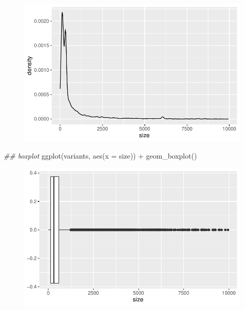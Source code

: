 \documentclass[
  letterpaper,
  DIV=11,
  numbers=noendperiod]{scrreprt}
\newenvironment{Shaded}{\begin{snugshade}}{\end{snugshade}}
\newcommand{\AttributeTok}[1]{\textcolor[rgb]{0.40,0.45,0.13}{#1}}
\newcommand{\DocumentationTok}[1]{\textcolor[rgb]{0.37,0.37,0.37}{\textit{#1}}}
\newcommand{\FunctionTok}[1]{\textcolor[rgb]{0.28,0.35,0.67}{#1}}
\newcommand{\NormalTok}[1]{\textcolor[rgb]{0.00,0.23,0.31}{#1}}
\newcommand{\SpecialCharTok}[1]{\textcolor[rgb]{0.37,0.37,0.37}{#1}}
\begin{document}
\begin{figure}[H]

{\centering \includegraphics{scripts/02_dataViz/class3_files/figure-pdf/unnamed-chunk-14-2.pdf}

}

\end{figure}

\begin{Shaded}
\begin{Highlighting}[]
\DocumentationTok{\#\# boxplot}
\FunctionTok{ggplot}\NormalTok{(variants, }\FunctionTok{aes}\NormalTok{(}\AttributeTok{x =}\NormalTok{ size)) }\SpecialCharTok{+}
  \FunctionTok{geom\_boxplot}\NormalTok{()}
\end{Highlighting}
\end{Shaded}

\begin{figure}[H]

{\centering \includegraphics{scripts/02_dataViz/class3_files/figure-pdf/unnamed-chunk-14-3.pdf}

}

\end{figure}
\end{document}
